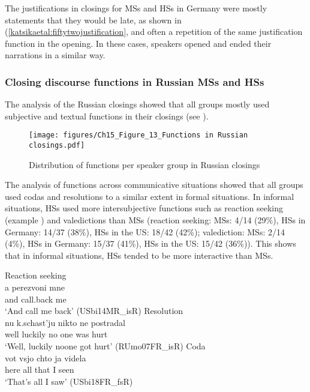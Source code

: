 \documentclass[output=paper,colorlinks,citecolor=brown]{langscibook}
\begin{document}
The justifications in closings for MSs and HSs in Germany were mostly statements that they would be late, as shown in (\ref{katsikaetal:fiftytwojustification}, and often a repetition of the same justification function in the opening. In these cases, speakers opened and ended their narrations in a similar way. 

\subsubsection{Closing discourse functions in Russian MSs and HSs}
The analysis of the Russian closings showed that all groups mostly used subjective and textual functions in their closings (see ).

\begin{figure}
    \centering
    \texttt{[image: figures/Ch15\_Figure\_13\_Functions in Russian closings.pdf]}
    \caption{Distribution of functions per speaker group in Russian closings}
    \label{fig:katsikaetal:Russianfunctionsclosings}
\end{figure}

The analysis of functions across communicative situations showed that all groups used codas and resolutions to a similar extent in formal situations. In informal situations, HSs used more intersubjective functions such as reaction seeking (example ) and valedictions than MSs (reaction seeking: MSs: 4/14 (29\%), HSs in Germany: 14/37 (38\%), HSs in the US: 18/42 (42\%); valediction: MSs: 2/14 (4\%), HSs in Germany: 15/37 (41\%), HSs in the US: 15/42 (36\%)). This shows that in informal situations, HSs tended to be more interactive than MSs.

\ea Reaction seeking\\ \label{katsikaetal:fiftythreereactionseek}
\gll a perezvoni mne\\
     and call.back me\\
\glt ‘And call me back’ (USbi14MR\_isR)
\ex Resolution\\ \label{katsikaetal:fiftyfourresolution}
\gll nu k.schast'ju nikto ne postradal\\
     well luckily no one was hurt\\
\glt ‘Well, luckily noone got hurt’ (RUmo07FR\_isR)
\ex Coda\\ \label{katsikaetal:fiftyfivecoda}
\gll vot vsjo chto ja videla\\
     here all that I seen\\
\glt ‘That's all I saw' (USbi18FR\_fsR)
\z
\end{document}
